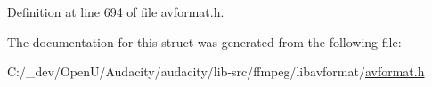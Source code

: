 Definition at line 694 of file avformat.\+h.



The documentation for this struct was generated from the following file\+:\begin{DoxyCompactItemize}
\item 
C\+:/\+\_\+dev/\+Open\+U/\+Audacity/audacity/lib-\/src/ffmpeg/libavformat/\hyperlink{avformat_8h}{avformat.\+h}\end{DoxyCompactItemize}
